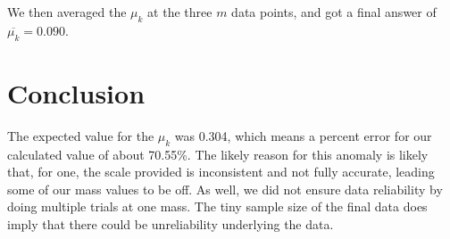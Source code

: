 \documentclass[12pt]{article}
\begin{document}
We then averaged the $\mu_k$ at the three $m$ data points, and got a final
answer of $\overline{\mu_k} = 0.090$.

\section{Conclusion}
The expected value for the $\mu_k$ was 0.304, which means a percent error for
our calculated value of about 70.55\%. The likely reason for this anomaly is
likely that, for one, the scale provided is inconsistent and not fully accurate,
leading some of our mass values to be off. As well, we did not ensure data
reliability by doing multiple trials at one mass. The tiny sample size of the
final data does imply that there could be unreliability underlying the data.
\end{document}
